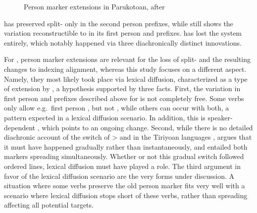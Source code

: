%
\begin{figure}[hbt]
	\centering
	\setlength{\tabcolsep}{2pt}
	\caption[Person marker extensions in Parukotoan]{Person marker extensions in Parukotoan, after \textcite[94]{gildea1998}}
	\label{fig:par_ext}
\end{figure}
%
\hixka has preserved split- only in the second person prefixes, while \kaxui still shows the variation reconstructible to \PPar in its first person and  prefixes.
\waiwai has lost the system entirely, which notably happened via three diachronically distinct innovations.



For \textcite{gildea1998}, person marker extensions are relevant for the loss of split- and the resulting changes to indexing alignment, whereas this study focuses on a different aspect.
Namely, they most likely took place via lexical diffusion, characterized as a type of extension by \textcite[106--115]{harris1995historical}, a hypothesis supported by three facts.
First, the variation in first person and  prefixes described above for \kaxui is not completely free.
Some verbs only allow e.g.\ first person , but not , while others can occur with both, a pattern expected in a lexical diffusion scenario.
In addition, this is speaker-dependent , which points to an ongoing change.
Second, while there is no detailed diachronic account of the switch of >  and   in the Tiriyoan languages , \textcite[111--112]{meira1998proto} argues that it must have happened gradually rather than instantaneously, and entailed both markers spreading simultaneously.
Whether or not this gradual switch followed ordered lines, lexical diffusion must have played a role.
The third argument in favor of the lexical diffusion scenario are the very forms under discussion.
A situation where some verbs preserve the old person marker fits very well with a scenario where lexical diffusion stops short of these verbs, rather than spreading affecting all potential targets.

